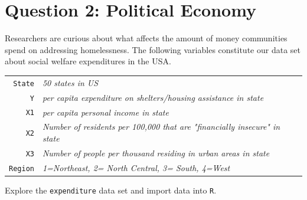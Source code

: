 \documentclass[12pt,letterpaper]{article}
\begin{document}
\newpage

	\section*{Question 2: Political Economy}

\noindent Researchers are curious about what affects the amount of money communities spend on addressing homelessness. The following variables constitute our data set about social welfare expenditures in the USA. \\
\vspace{.5cm}


\begin{tabular}{r|l}
	\texttt{State} &\emph{50 states in US} \\
	\texttt{Y} & \emph{per capita expenditure on shelters/housing assistance in state}\\
	\texttt{X1} &\emph{per capita personal income in state} \\
	\texttt{X2} &  \emph{Number of residents per 100,000 that are "financially insecure" in state}\\
	\texttt{X3} &  \emph{Number of people per thousand residing in urban areas in state} \\
	\texttt{Region} &  \emph{1=Northeast, 2= North Central, 3= South, 4=West} \\
\end{tabular}

\vspace{.5cm}
\noindent Explore the \texttt{expenditure} data set and import data into \texttt{R}.
\vspace{.5cm}
\end{document}

